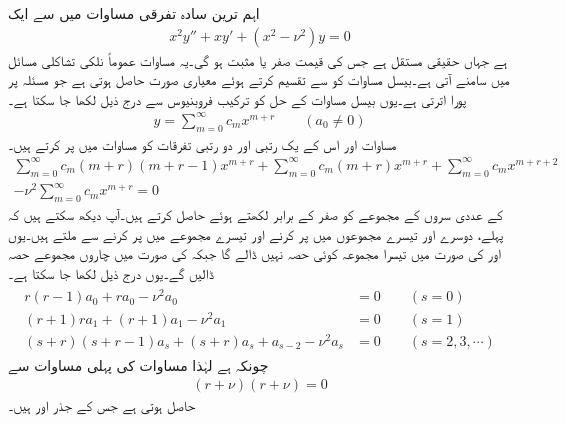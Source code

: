 اہم ترین سادہ تفرقی مساوات میں سے ایک 
\begin{align}\label{مساوات_بیسل_الف}
x^2y''+xy'+(x^2-\nu^2)y=0
\end{align}
ہے جہاں  حقیقی مستقل ہے جس کی قیمت صفر یا مثبت ہو گی۔یہ مساوات عموماً نلکی تشاکلی مسائل میں سامنے آتی ہے۔بیسل مساوات کو  سے تقسیم کرتے ہوئے معیاری صورت  حاصل ہوتی ہے جو مسئلہ  پر پورا اترتی ہے۔یوں بیسل مساوات کے حل کو ترکیب فروبنیوس سے درج ذیل لکھا جا سکتا ہے۔
\begin{align}\label{مساوات_بیسل_ب}
y=\sum_{m=0}^{\infty}c_mx^{m+r}\quad \quad (a_0 \ne 0)
\end{align}
مساوات  اور اس کے یک رتبی اور دو رتبی تفرقات کو مساوات  میں پر کرتے ہیں۔
\begin{multline*}
\sum_{m=0}^{\infty}c_m(m+r)(m+r-1)x^{m+r}+\sum_{m=0}^{\infty}c_m(m+r)x^{m+r}+\sum_{m=0}^{\infty}c_mx^{m+r+2}\\
-\nu^2\sum_{m=0}^{\infty}c_mx^{m+r}=0
\end{multline*}
 کے عددی سروں کے مجموعے کو صفر کے برابر لکھتے ہوئے  حاصل کرتے ہیں۔آپ دیکھ سکتے ہیں کہ  پہلے، دوسرے اور تیسرے مجموعوں میں  پر کرنے اور تیسرے مجموعے میں  پر کرنے سے ملتے ہیں۔یوں  اور  کی صورت میں تیسرا مجموعہ کوئی حصہ نہیں ڈالے گا جبکہ  کی صورت میں چاروں مجموعے حصہ ڈالیں گے۔یوں درج ذیل لکھا جا سکتا ہے۔
\begin{gather}
\begin{aligned}\label{مساوات_بیسل_پ}
r(r-1)a_0+ra_0-\nu^2a_0&=0\quad \quad (s=0)\\
(r+1)ra_1+(r+1)a_1-\nu^2a_1&=0\quad \quad (s=1)\\
(s+r)(s+r-1)a_s+(s+r)a_s+a_{s-2}-\nu^2a_s&=0\quad \quad (s=2,3,\cdots)
\end{aligned}
\end{gather}  
چونکہ  ہے لہٰذا مساوات  کی پہلی مساوات  سے   
\begin{align}\label{مساوات_بیسل_ت}
(r+\nu)(r+\nu)=0
\end{align}
حاصل ہوتی ہے جس کے جذر  اور  ہیں۔

